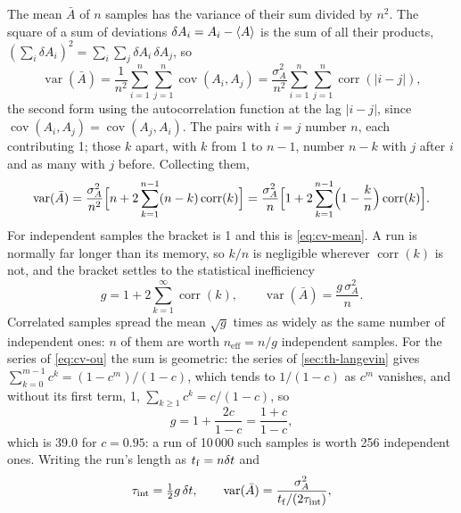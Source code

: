 The mean $\bar A$ of $n$ samples has the variance of their sum divided by
$n^2$. The square of a sum of deviations $\delta A_i = A_i - \langle A \rangle$ is
the sum of all their products, $(\sum_i\delta A_i)^2 =
\sum_i\sum_j\delta A_i\,\delta A_j$, so
\begin{equation*}
   \operatorname{var}(\bar A) = \frac{1}{n^2}\sum_{i=1}^n\sum_{j=1}^n
   \operatorname{cov}(A_i, A_j)
   = \frac{\sigma_A^2}{n^2}\sum_{i=1}^n\sum_{j=1}^n
   \operatorname{corr}(\lvert i - j\rvert) ,
\end{equation*}
the second form using the autocorrelation function at the lag $\lvert i -
j\rvert$, since $\operatorname{cov}(A_i, A_j) = \operatorname{cov}(A_j,
A_i)$. The pairs with $i = j$ number $n$, each contributing 1; those $k$ apart,
with $k$ from 1 to $n - 1$, number $n - k$ with $j$ after $i$ and as many
with $j$ before. Collecting them,
\begin{equation}
   \operatorname{var}(\bar A)
   = \frac{\sigma_A^2}{n^2}\Bigl[n + 2\sum_{k=1}^{n-1}(n - k)
   \operatorname{corr}(k)\Bigr]
   = \frac{\sigma_A^2}{n}\Bigl[1 + 2\sum_{k=1}^{n-1}\Bigl(1 - \frac kn\Bigr)
   \operatorname{corr}(k)\Bigr] .
   \label{eq:cv-var}
\end{equation}
For independent samples the bracket is 1 and this is \cref{eq:cv-mean}. A
run is normally far longer than its memory, so $k/n$ is negligible
wherever $\operatorname{corr}(k)$ is not, and the bracket settles to the
statistical inefficiency\cite{Chodera2007}
\begin{equation*}
   g = 1 + 2\sum_{k=1}^{\infty}\operatorname{corr}(k) , \qquad
   \operatorname{var}(\bar A) = \frac{g\,\sigma_A^2}{n} .
\end{equation*}
Correlated samples spread the mean $\sqrt g$ times as widely as the same
number of independent ones: $n$ of them are worth $n_{\mathrm{eff}} = n/g$
independent samples. For the series of \cref{eq:cv-ou} the sum is
geometric: the series of \cref{sec:th-langevin} gives $\sum_{k=0}^{m-1}c^k
= (1 - c^m)/(1 - c)$, which tends to $1/(1 - c)$ as $c^m$ vanishes, and
without its first term, 1, $\sum_{k\ge1}c^k = c/(1 - c)$, so
\begin{equation*}
   g = 1 + \frac{2c}{1 - c} = \frac{1 + c}{1 - c} ,
\end{equation*}
which is 39.0 for $c = 0.95$: a run of 10\,000 such samples is worth 256
independent ones. Writing the run's length as $t_{\mathrm f} = n\delta t$ and
\begin{equation*}
   \tau_{\mathrm{int}} = \tfrac12g\,\delta t , \qquad
   \operatorname{var}(\bar A) = \frac{\sigma_A^2}{t_{\mathrm f}/
   (2\tau_{\mathrm{int}})} ,
\end{equation*}
